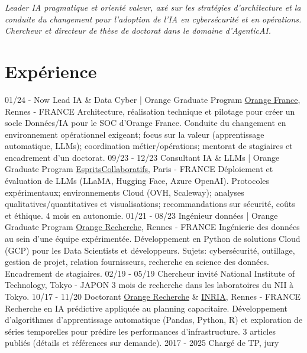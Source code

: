\documentclass[]{friggeri-cv}
\begin{document}
\emph{Leader IA pragmatique et orienté valeur, axé sur les stratégies d'architecture et la conduite du changement pour l'adoption de l'IA en cybersécurité et en opérations. Chercheur et directeur de thèse de doctorat dans le domaine d'AgenticAI.} 
\vspace{-0.5em}
\section{Expérience}
\vspace{-0.5em}
\begin{entrylist}
 \entry
 {01/24 - Now}
 {Lead IA \& Data Cyber | Orange Graduate Program}
 {\href{http://www.orange.com/en/home}{Orange France}, Rennes - FRANCE}
 {Architecture, réalisation technique et pilotage pour créer un socle Données/IA pour le SOC d’Orange France. Conduite du changement en environnement opérationnel exigeant; focus sur la valeur (apprentissage automatique, LLMs); coordination métier/opérations; mentorat de stagiaires et encadrement d’un doctorat.}
 \entry
 {09/23 - 12/23}
 {Consultant IA \& LLMs | Orange Graduate Program}
 {\href{https://www.curebot.fr/}{EspritsCollaboratifs}, Paris - FRANCE}
 {Déploiement et évaluation de LLMs (LLaMA, Hugging Face, Azure OpenAI). Protocoles expérimentaux; environnements Cloud (OVH, Scaleway); analyses qualitatives/quantitatives et visualisations; recommandations sur sécurité, coûts et éthique. 4 mois en autonomie.}
 \entry
 {01/21 - 08/23}
 {Ingénieur données | Orange Graduate Program}
 {\href{http://www.orange.com/en/home}{Orange Recherche}, Rennes - FRANCE}
 {Ingénierie des données au sein d’une équipe expérimentée. Développement en Python de solutions Cloud (GCP) pour les Data Scientists et développeurs. Sujets: cybersécurité, outillage, gestion de projet, relation fournisseurs, recherche en science des données. Encadrement de stagiaires.}
 \entry
 {02/19 - 05/19}
 {Chercheur invité}
 {National Institute of Technology, Tokyo - JAPON}
 {3 mois de recherche dans les laboratoires du NII à Tokyo. } %
 \entry
 {10/17 - 11/20}
 {Doctorant}
 {\href{http://www.orange.com/en/home}{Orange Recherche} \& \href{https://www.inria.fr/fr}{INRIA}, Rennes - FRANCE}
 {Recherche en IA prédictive appliquée au planning capacitaire. Développement d’algorithmes d’apprentissage automatique (Pandas, Python, R) et exploration de séries temporelles pour prédire les performances d’infrastructure. 3 articles publiés (détails et références sur demande).}
 \entry
 {2017 - 2025}
 {Chargé de TP, jury}

\end{entrylist}
\end{document}
